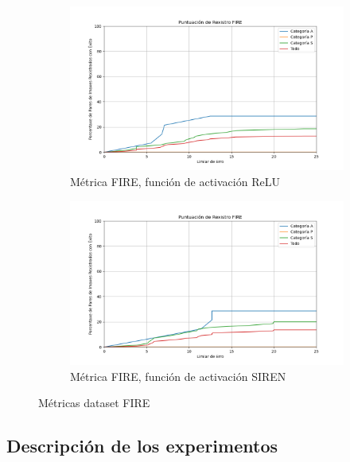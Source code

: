 \begin{figure}[tbp]
    \centering
    \begin{subfigure}[b]{0.5\textwidth}
        \centering
        \includegraphics[width=\textwidth]{imaxes/FIRE_scores/fire_registration_score_ReLU.png}
        \caption{Métrica FIRE, función de activación ReLU}
        \label{fig:FIRE_relu}
    \end{subfigure}\hfill
    \begin{subfigure}[b]{0.5\textwidth}
        \centering
        \includegraphics[width=\textwidth]{imaxes/FIRE_scores/fire_registration_scores_SIREN.png}
        \caption{Métrica FIRE, función de activación SIREN}
        \label{fig:FIRE_SIREN}
    \end{subfigure}
    \caption{Métricas dataset FIRE}
    \label{fig:FIRE_scores}
\end{figure}

\subsection{Descripción de los experimentos}
\label{subsec:Descrición dos experimentos}

